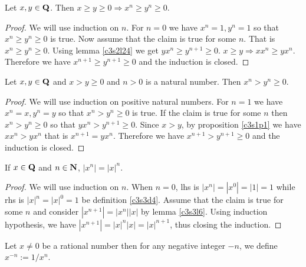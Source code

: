 \begin{lem}\label{c3s3l22}
Let $x, y \in \mathbf{Q}$. Then $x \ge y \ge 0 \Rightarrow x^n \ge y^n \ge 0$.
\end{lem}
\begin{proof}
We will use induction on $n$. For $n = 0$ we have $x^n = 1, y^n = 1$ so 
that $x^n \ge y^n \ge 0$ is true. Now assume that the claim is true for
some $n$. That is $x^n \ge y^n \ge 0$. Using lemma \ref{c3s2l24} we get
$yx^n \ge y^{n+1} \ge 0$. $x \ge y \Rightarrow xx^n \ge yx^n$. Therefore
we have $x^{n+1} \ge y^{n+1} \ge 0$ and the induction is closed.
\end{proof}

\begin{lem}\label{c3s3l23}
Let $x, y \in \mathbf{Q}$ and $x > y \ge 0$ and $n > 0$ is a natural number.
Then $x^n > y^n \ge 0$.
\end{lem}
\begin{proof}
We will use induction on positive natural numbers. For $n=1$ we have $x^n
= x, y^n = y$ so that $x^n > y^n \ge 0$ is true. If the claim is true for
some $n$ then $x^n > y^n \ge 0$ so that $yx^n > y^{n+1} \ge 0$. Since $x > 
y$, by proposition \ref{c3s1p1} we have $xx^n > yx^n$ that is $x^{n+1} = 
yx^n$. Therefore we have $x^{n+1} > y^{n+1} \ge 0$ and the induction is
closed.
\end{proof}

\begin{lem}\label{x3s3l24}
If $x \in \mathbf{Q}$ and $n \in \mathbf{N}$, $|x^n| = |x|^n$.
\end{lem}
\begin{proof}
We will use induction on $n$. When $n=0$, lhs is $|x^n| = |x^0| = |1| = 1$
while rhs is $|x|^n = |x|^0 = 1$ be definition \ref{c3s3d4}. Assume that 
the claim is true for some $n$ and consider $|x^{n+1}| = |x^n||x|$ by 
lemma \ref{c3s3l6}. Using induction hypothesis, we have $|x^{n+1}| = 
|x|^n |x| = |x|^{n+1}$, thus closing the induction.
\end{proof}

\begin{defn}\label{c3s3d5}
Let $x \ne 0$ be a rational number then for any negative integer $-n$, we
define $x^{-n} := 1/x^n$.
\end{defn}

